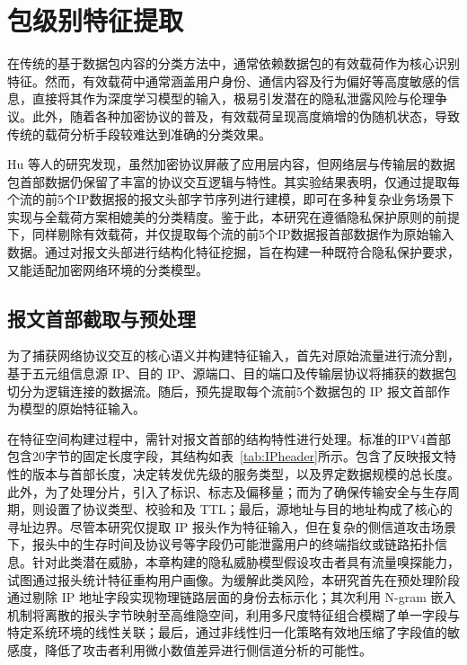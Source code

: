 \section{包级别特征提取}
在传统的基于数据包内容的分类方法中，通常依赖数据包的有效载荷作为核心识别特征。然而，有效载荷中通常涵盖用户身份、通信内容及行为偏好等高度敏感的信息，直接将其作为深度学习模型的输入，极易引发潜在的隐私泄露风险与伦理争议。此外，随着各种加密协议的普及，有效载荷呈现高度熵增的伪随机状态，导致传统的载荷分析手段较难达到准确的分类效果。

Hu 等人的研究发现，虽然加密协议屏蔽了应用层内容，但网络层与传输层的数据包首部数据仍保留了丰富的协议交互逻辑与特性。其实验结果表明，仅通过提取每个流的前5个IP数据报的报文头部字节序列进行建模，即可在多种复杂业务场景下实现与全载荷方案相媲美的分类精度\cite{hu2024online}。鉴于此，本研究在遵循隐私保护原则的前提下，同样剔除有效载荷，并仅提取每个流的前5个IP数据报首部数据作为原始输入数据。通过对报文头部进行结构化特征挖掘，旨在构建一种既符合隐私保护要求，又能适配加密网络环境的分类模型。

\subsection{报文首部截取与预处理}
为了捕获网络协议交互的核心语义并构建特征输入，首先对原始流量进行流分割，基于五元组信息{源 IP、目的 IP、源端口、目的端口及传输层协议}将捕获的数据包切分为逻辑连接的数据流。随后，预先提取每个流前5个数据包的 IP 报文首部作为模型的原始特征输入。

在特征空间构建过程中，需针对报文首部的结构特性进行处理。标准的IPV4首部包含20字节的固定长度字段，其结构如表~\ref{tab:IPheader}所示。包含了反映报文特性的版本与首部长度，决定转发优先级的服务类型，以及界定数据规模的总长度。此外，为了处理分片，引入了标识、标志及偏移量；而为了确保传输安全与生存周期，则设置了协议类型、校验和及 TTL；最后，源地址与目的地址构成了核心的寻址边界。尽管本研究仅提取 IP 报头作为特征输入，但在复杂的侧信道攻击场景下，报头中的生存时间及协议号等字段仍可能泄露用户的终端指纹或链路拓扑信息。针对此类潜在威胁，本章构建的隐私威胁模型假设攻击者具有流量嗅探能力，试图通过报头统计特征重构用户画像。为缓解此类风险，本研究首先在预处理阶段通过剔除 IP 地址字段实现物理链路层面的身份去标示化；其次利用 N-gram 嵌入机制将离散的报头字节映射至高维隐空间，利用多尺度特征组合模糊了单一字段与特定系统环境的线性关联；最后，通过非线性归一化策略有效地压缩了字段值的敏感度，降低了攻击者利用微小数值差异进行侧信道分析的可能性。

